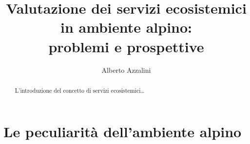 \documentclass[12pt,a4paper]{article}
\author{Alberto Azzalini}
\title{Valutazione dei servizi ecosistemici in ambiente alpino:\\ problemi e prospettive}
\begin{document}
	\maketitle
	\begin{abstract}
		L'introduzione del concetto di servizi ecosistemici\dots
	\end{abstract}
	\section{Le peculiarità dell'ambiente alpino}
\end{document}
